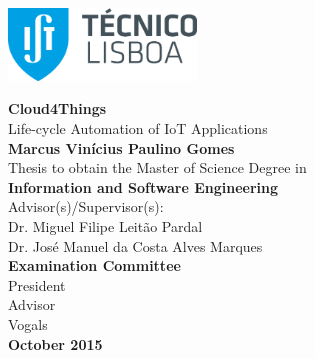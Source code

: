 \begin{titlepage}
\includegraphics[width=5cm]{images/ist_logo}~\\[2.0cm]
\begin{center}
{\LARGE \textbf{Cloud4Things}}\\[1.0cm]
{\Large Life-cycle Automation of IoT Applications}\\[1.0cm]
{\Large \textbf{Marcus Vin\'icius Paulino Gomes}}\\[1.0cm]
{\large Thesis to obtain the Master of Science Degree in}\\[1.0cm]
{\LARGE \textbf{Information and Software Engineering}}\\[1.0cm]
{\large Advisor(s)/Supervisor(s):}\\
{\large Dr. Miguel Filipe Leit\~ao Pardal}\\
{\large Dr. Jos\'e Manuel da Costa Alves Marques}\\[1.0cm]
{\Large \textbf{Examination Committee}}\\
{\large President}\\
{\large Advisor}\\
{\large Vogals}\\[1.0cm]
{\Large \textbf{October 2015}}\\
\end{center}
\end{titlepage}
